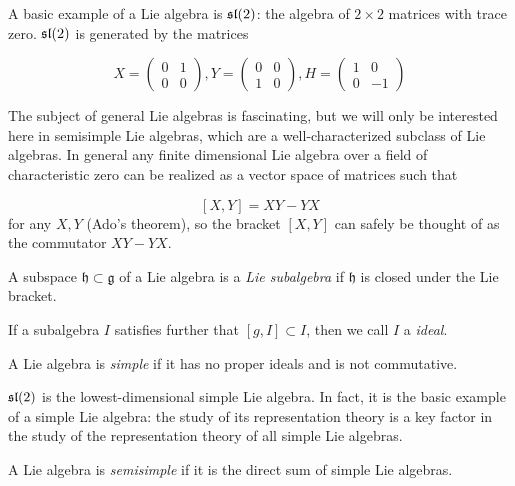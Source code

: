 A basic example of a Lie algebra is $\mathfrak{sl}(2)$: the algebra of $2 \times 2$
matrices with trace zero. $\mathfrak{sl}(2)$ is generated by the matrices 

\begin{equation}
    X = \begin{pmatrix} 0 & 1 \\ 0 & 0 \end{pmatrix},
    Y = \begin{pmatrix} 0 & 0 \\ 1 & 0 \end{pmatrix}, 
    H = \begin{pmatrix} 1 & 0 \\ 0 &-1 \end{pmatrix}
\end{equation}

The subject of general Lie algebras is fascinating, but we will only be
interested here in semisimple Lie algebras, which are a well-characterized
subclass of Lie algebras. In general any finite dimensional Lie algebra over a
field of characteristic zero can be realized as a vector space of matrices such
that 

\[ \left[ X,Y \right] = XY - YX\] 
for any $X,Y$ (Ado's theorem), so the bracket $[X,Y]$ can safely be thought of
as the commutator $XY - YX$. 

\begin{defn}
    A subspace $\mathfrak{h} \subset \mathfrak{g}$ of a Lie algebra is a
    \emph{Lie subalgebra} if $\mathfrak{h}$ is closed under the Lie bracket. 

    If a subalgebra $I$ satisfies further that $[g,I] \subset I$, then we call
    $I$ a \emph{ideal}.
\end{defn}

\begin{defn}
    A Lie algebra is \emph{simple} if it has no proper ideals and is not
    commutative. 
\end{defn}

$\mathfrak{sl}(2)$ is the lowest-dimensional simple Lie algebra. In fact, it is the
basic example of a simple Lie algebra: the study of its representation theory
is a key factor in the study of the representation theory of all simple Lie
algebras.

\begin{defn}
    A Lie algebra is \emph{semisimple} if it is the direct sum of simple Lie algebras.
\end{defn}


